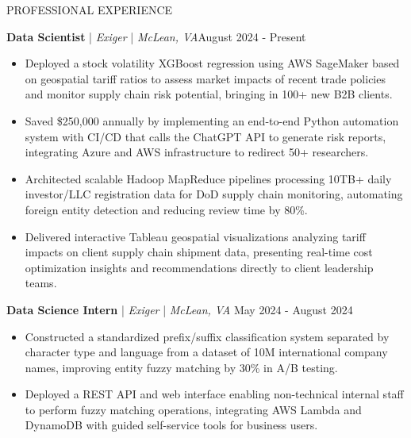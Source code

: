 \begin{rSection}{PROFESSIONAL EXPERIENCE}
    \renewcommand{\labelitemi}{\rule{0.8ex}{0.8ex}}

    \textbf{Data Scientist} | \textit{Exiger} | \textit{McLean, VA}\hfill August 2024 - Present\\
    \begin{itemize}[leftmargin=12pt]
        \itemsep -4pt {} \vspace{-1.75em}
        \item Deployed a stock volatility XGBoost regression using AWS SageMaker based on geospatial tariff ratios to assess market impacts of recent trade policies and monitor supply chain risk potential, bringing in 100+ new B2B clients.
        \item Saved \$250,000 annually by implementing an end-to-end Python automation system with CI/CD that calls the ChatGPT API to generate risk reports, integrating Azure and AWS infrastructure to redirect 50+ researchers.
        \item Architected scalable Hadoop MapReduce pipelines processing 10TB+ daily investor/LLC registration data for DoD supply chain monitoring, automating foreign entity detection and reducing review time by 80\%.
        \item Delivered interactive Tableau geospatial visualizations analyzing tariff impacts on client supply chain shipment data, presenting real-time cost optimization insights and recommendations directly to client leadership teams.
    \end{itemize}

    \vspace{-0.15em}
    
    \textbf{Data Science Intern} | \textit{Exiger} | \textit{McLean, VA} \hfill May 2024 - August 2024\\
    \begin{itemize}[leftmargin=12pt]
        \itemsep -4pt {} \vspace{-1.75em}
        \item Constructed a standardized prefix/suffix classification system separated by character type and language from a dataset of 10M international company names, improving entity fuzzy matching by 30\% in A/B testing.
        \item Deployed a REST API and web interface enabling non-technical internal staff to perform fuzzy matching operations, integrating AWS Lambda and DynamoDB with guided self-service tools for business users.
    \end{itemize}


\end{rSection}
